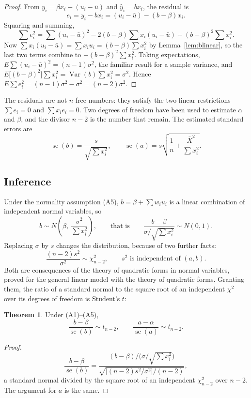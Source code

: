 \documentclass[11pt,a4paper]{article}
\numberwithin{equation}{section}
\DeclareMathOperator{\Var}{Var}
\theoremstyle{definition}
\newtheorem{thm}{Theorem}[subsection]
\begin{document}
\begin{proof}
From $y_i = \beta x_i + (u_i - \bar u)$ and $\hat y_i = bx_i$, the residual is
\[
e_i = y_i - bx_i = (u_i - \bar u) - (b - \beta)x_i .
\]
Squaring and summing,
\[
\sum e_i^2 = \sum (u_i - \bar u)^2 - 2(b - \beta)\sum x_i(u_i - \bar u) + (b - \beta)^2\sum x_i^2 .
\]
Now $\sum x_i(u_i - \bar u) = \sum x_iu_i = (b - \beta)\sum x_i^2$ by Lemma~\ref{lem:blinear}, so the last two terms combine to
$-(b - \beta)^2\sum x_i^2$. Taking expectations, $E\sum (u_i - \bar u)^2 = (n-1)\sigma^2$, the familiar result for a sample variance, and
$E\bigl[(b - \beta)^2\bigr]\sum x_i^2 = \Var(b)\sum x_i^2 = \sigma^2$. Hence $E\sum e_i^2 = (n-1)\sigma^2 - \sigma^2 = (n-2)\sigma^2$.
\end{proof}

The residuals are not $n$ free numbers: they satisfy the two linear restrictions $\sum e_i = 0$ and $\sum x_ie_i = 0$. Two degrees of freedom have
been used to estimate $\alpha$ and $\beta$, and the divisor $n - 2$ is the number that remain. The estimated standard errors are
\[
\operatorname{se}(b) = \frac{s}{\sqrt{\sum x_i^2}}, \qquad
\operatorname{se}(a) = s\sqrt{\frac1n + \frac{\bar X^2}{\sum x_i^2}} .
\]

\subsection{Inference}
\label{ssec:inf2}

Under the normality assumption (A5), $b = \beta + \sum w_iu_i$ is a linear combination of independent normal variables, so
\[
b \sim N\!\left(\beta,\ \frac{\sigma^2}{\sum x_i^2}\right), \qquad\text{that is}\qquad \frac{b - \beta}{\sigma/\sqrt{\sum x_i^2}} \sim N(0, 1) .
\]
Replacing $\sigma$ by $s$ changes the distribution, because of two further facts:
\[
\frac{(n-2)s^2}{\sigma^2} \sim \chi^2_{n-2}, \qquad s^2 \text{ is independent of } (a, b) .
\]
Both are consequences of the theory of quadratic forms in normal variables, proved for the general linear model with the theory of quadratic forms. Granting them, the
ratio of a standard normal to the square root of an independent $\chi^2$ over its degrees of freedom is Student's $t$:

\begin{thm}
\label{thm:t2}
Under (A1)--(A5),
\[
\frac{b - \beta}{\operatorname{se}(b)} \sim t_{n-2}, \qquad \frac{a - \alpha}{\operatorname{se}(a)} \sim t_{n-2} .
\]
\end{thm}

\begin{proof}
\[
\frac{b - \beta}{\operatorname{se}(b)} = \frac{(b - \beta)\big/\bigl(\sigma/\sqrt{\sum x_i^2}\bigr)}{\sqrt{\bigl[(n-2)s^2/\sigma^2\bigr]\big/(n-2)}} ,
\]
a standard normal divided by the square root of an independent $\chi^2_{n-2}$ over $n - 2$. The argument for $a$ is the same.
\end{proof}
\end{document}
